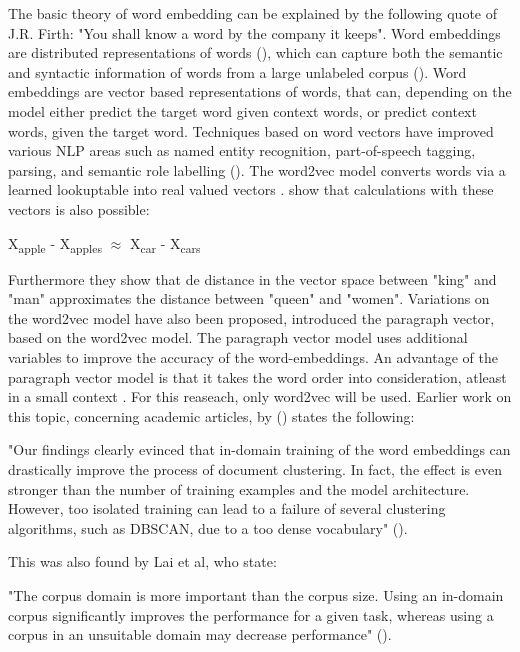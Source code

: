 \documentclass[../../Thesis.tex]{subfiles}
\begin{document}
The basic theory of word embedding can be explained by the following quote of J.R. Firth: "You shall know a word by the company it keeps". Word embeddings are distributed representations of words (\citet{mikolov2013distributed}), which can capture both the semantic and syntactic information of words from a large unlabeled corpus (\citet{lai2016generate}).
Word embeddings are vector based representations of words, that can, depending on the model either predict the target word given context words, or predict context words, given the target word. Techniques based on word vectors have improved various NLP areas such as named entity recognition, part-of-speech tagging, parsing, and semantic role labelling (\citet{luong2013better}).
The word2vec model converts words via a learned lookuptable into real valued vectors \cite{mikolov2013linguistic}. \citet{mikolov2013linguistic} show that calculations with these vectors is also possible:
\begin{displayquote}
	X\textsubscript{apple} - X\textsubscript{apples} $\approx$  X\textsubscript{car} - X\textsubscript{cars}
\end{displayquote}
Furthermore they show that de distance in the vector space between "king" and "man" approximates the distance between "queen" and "women". Variations on the word2vec model have also been proposed, \citet{le2014distributed} introduced the paragraph vector, based on the word2vec model. The paragraph vector model uses additional variables to improve the accuracy of the word-embeddings. An advantage of the paragraph vector model is that it takes the word order into consideration, atleast in a small context \cite{le2014distributed}. For this reaseach, only word2vec will be used.
Earlier work on this topic, concerning academic articles, by (\citet{Truong2017Thesis}) states the following: 
\begin{displayquote}
"Our findings clearly evinced that in-domain training of the
word embeddings can drastically improve the process of document clustering. In fact, the
effect is even stronger than the number of training examples and the model architecture.
However, too isolated training can lead to a failure of several clustering algorithms, such as DBSCAN, due to a too dense vocabulary" (\citet{Truong2017Thesis}).
\end{displayquote}
This was also found by Lai et al, who state: 
\begin{displayquote}
"The corpus domain is more important than the corpus size. Using an in-domain corpus significantly improves the performance for a given task, whereas using a corpus in an unsuitable domain may decrease performance" (\citet{lai2016generate}).
\end{displayquote}
\end{document}
